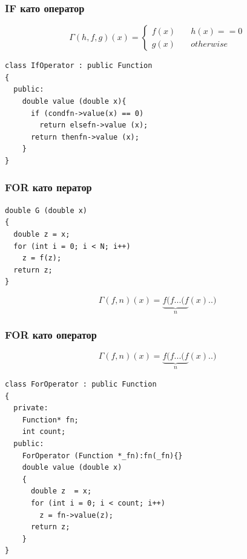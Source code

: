 \documentclass{beamer}
\begin{document}
\begin{frame}[fragile]
\frametitle{IF като оператор}

\begin{center}
$$
\Gamma(h,f,g)(x) = \left\{
        \begin{array}{ll}
            f(x) & \quad h(x) == 0 \\
            g(x) & \quad otherwise
        \end{array}
    \right.
$$


\begin{lstlisting}
class IfOperator : public Function
{
  public:
    double value (double x){
      if (condfn->value(x) == 0)
        return elsefn->value (x);
      return thenfn->value (x);
    }
}
\end{lstlisting}
  
\end{center}


\end{frame}



\begin{frame}[fragile]
\frametitle{FOR като ператор}

\begin{center}

\begin{lstlisting}
double G (double x)
{
  double z = x;
  for (int i = 0; i < N; i++)
    z = f(z);
  return z;
}
\end{lstlisting}
  
\end{center}


$$
\Gamma(f,n)(x) = \underbrace{f(f...(f}_n(x)..)
$$



\end{frame}




\begin{frame}[fragile]
\frametitle{FOR като оператор}

\begin{center}

$$
\Gamma(f,n)(x) = \underbrace{f(f...(f}_n(x)..)
$$



\begin{lstlisting}
class ForOperator : public Function
{
  private:
    Function* fn;
    int count;
  public:
    ForOperator (Function *_fn):fn(_fn){}
    double value (double x)
    {
      double z  = x;
      for (int i = 0; i < count; i++)
        z = fn->value(z);
      return z;
    }
}
\end{lstlisting}
  
\end{center}


\end{frame}
\end{document}
